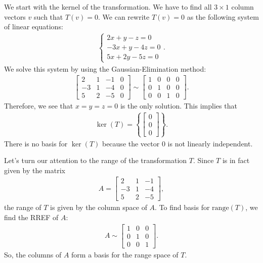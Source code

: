 \documentclass[12pt]{article}
\newcommand{\exo}[2]{\noindent\textcolor{red}{\fbox{\textbf{Section {#1}, Problem {#2}}}}\\}
\begin{document}
	\exo{5.1}{24}
	\\
	We start with the kernel of the transformation. We have to find all $3 \times 1$ column vectors $v$ such that $T(v) = 0$. We can rewrite $T(v) = 0$ as the following system of linear equations:
		\begin{align*}
		\left\lbrace \begin{matrix}
		2x + y - z = 0 \\
		-3x + y - 4z = 0 \\
		5x + 2y - 5z = 0
		\end{matrix} \right. .
		\end{align*}
	We solve this system by using the Gaussian-Elimination method:
		\begin{align*}
		\left[\begin{matrix}2 & 1 & -1 & 0\\-3 & 1 & -4 & 0\\5 & 2 & -5 & 0\end{matrix}\right] \sim \left[\begin{matrix}1 & 0 & 0 & 0\\0 & 1 & 0 & 0\\0 & 0 & 1 & 0\end{matrix}\right] .
		\end{align*}
	Therefore, we see that $x = y = z = 0$ is the only solution. This implies that 
		\begin{align*}
		\ker (T) = \left\lbrace \begin{bmatrix} 0 \\ 0 \\ 0 \end{bmatrix} \right\rbrace .
		\end{align*}
	There is no basis for $\ker (T)$ because the vector $0$ is not linearly independent.
		
	Let's turn our attention to the range of the transformation $T$. Since $T$ is in fact given by the matrix
		\begin{align*}
		A = \begin{bmatrix}
		2 & 1 & -1 \\
		-3 & 1 & -4 \\
		5 & 2 & -5
		\end{bmatrix} , 
		\end{align*}
	the range of $T$ is given by the column space of $A$. To find basis for $\mathrm{range} (T)$, we find the RREF of $A$:
		\begin{align*}
		A \sim \begin{bmatrix}
		1 & 0 & 0 \\ 0 & 1 & 0 \\ 0 & 0 & 1
		\end{bmatrix} .
		\end{align*}
	So, the columns of $A$ form a basis for the range space of $T$.
	
\end{document}
